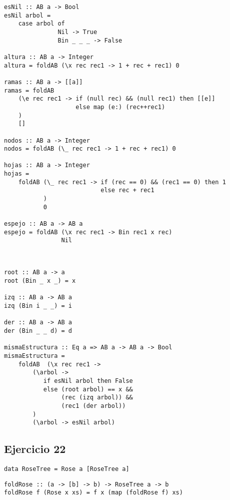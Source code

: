 \begin{centrado}
    \begin{verbatim}
esNil :: AB a -> Bool
esNil arbol = 
    case arbol of
               Nil -> True
               Bin _ _ _ -> False

altura :: AB a -> Integer
altura = foldAB (\x rec rec1 -> 1 + rec + rec1) 0

ramas :: AB a -> [[a]]
ramas = foldAB 
    (\e rec rec1 -> if (null rec) && (null rec1) then [[e]]
                    else map (e:) (rec++rec1)
    )
    []

nodos :: AB a -> Integer
nodos = foldAB (\_ rec rec1 -> 1 + rec + rec1) 0

hojas :: AB a -> Integer
hojas = 
    foldAB (\_ rec rec1 -> if (rec == 0) && (rec1 == 0) then 1
                           else rec + rec1
           )
           0

espejo :: AB a -> AB a
espejo = foldAB (\x rec rec1 -> Bin rec1 x rec)
                Nil
\end{verbatim}
\end{centrado}

\begin{centrado}
	\begin{verbatim}


root :: AB a -> a
root (Bin _ x _) = x

izq :: AB a -> AB a
izq (Bin i _ _) = i

der :: AB a -> AB a
der (Bin _ _ d) = d

mismaEstructura :: Eq a => AB a -> AB a -> Bool
mismaEstructura = 
    foldAB  (\x rec rec1 ->
        (\arbol ->
           if esNil arbol then False
           else (root arbol) == x && 
                (rec (izq arbol)) && 
                (rec1 (der arbol))
        )
        (\arbol -> esNil arbol)

	\end{verbatim}
\end{centrado}
\subsection{Ejercicio 22}
\begin{centrado}
    \begin{verbatim}
data RoseTree = Rose a [RoseTree a]   
    \end{verbatim}
\end{centrado}

\begin{centrado}
    \begin{verbatim}
foldRose :: (a -> [b] -> b) -> RoseTree a -> b
foldRose f (Rose x xs) = f x (map (foldRose f) xs)
    \end{verbatim}
\end{centrado}


